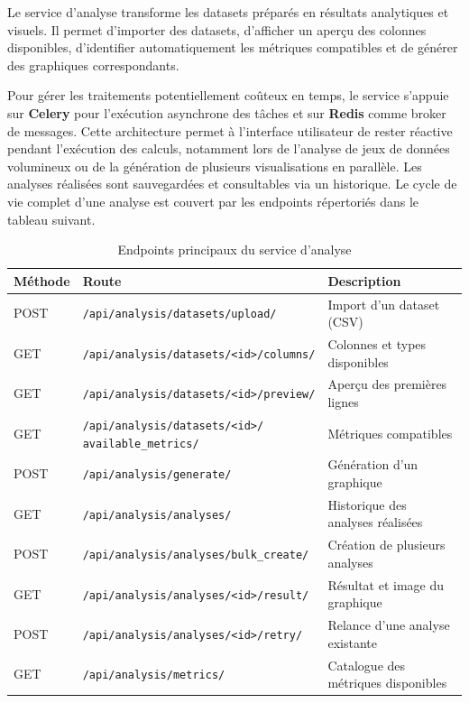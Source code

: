 Le service d'analyse transforme les datasets préparés en résultats analytiques et visuels. Il
permet d'importer des datasets, d'afficher un aperçu des colonnes disponibles, d'identifier
automatiquement les métriques compatibles et de générer des graphiques correspondants.

Pour gérer les traitements potentiellement coûteux en temps, le service s'appuie sur
\textbf{Celery} pour l'exécution asynchrone des tâches et sur \textbf{Redis} comme broker de
messages. Cette architecture permet à l'interface utilisateur de rester réactive pendant
l'exécution des calculs, notamment lors de l'analyse de jeux de données volumineux ou de la
génération de plusieurs visualisations en parallèle. Les analyses réalisées sont sauvegardées
et consultables via un historique. Le cycle de vie complet d'une analyse est couvert par les
endpoints répertoriés dans le tableau suivant.

\begin{table}[H]
\centering
\small
\caption{Endpoints principaux du service d'analyse}
\label{tab:endpoints-analyze}
\begin{tabular}{|>{\centering\arraybackslash}p{1.5cm}
                |>{\raggedright\arraybackslash}p{7.2cm}
                |>{\raggedright\arraybackslash}p{3.8cm}|}
\hline
\textbf{Méthode} & \textbf{Route} & \textbf{Description} \\
\hline
POST & \texttt{/api/analysis/datasets/upload/} & Import d'un dataset (CSV) \\
\hline
GET & \texttt{/api/analysis/datasets/<id>/columns/} & Colonnes et types disponibles \\
\hline
GET & \texttt{/api/analysis/datasets/<id>/preview/} & Aperçu des premières lignes \\
\hline
GET & \makecell[l]{\texttt{/api/analysis/datasets/<id>/} \\ \texttt{available\_metrics/}} & Métriques compatibles \\
\hline
POST & \texttt{/api/analysis/generate/} & Génération d'un graphique \\
\hline
GET & \texttt{/api/analysis/analyses/} & Historique des analyses réalisées \\
\hline
POST & \texttt{/api/analysis/analyses/bulk\_create/} & Création de plusieurs analyses \\
\hline
GET & \texttt{/api/analysis/analyses/<id>/result/} & Résultat et image du graphique \\
\hline
POST & \texttt{/api/analysis/analyses/<id>/retry/} & Relance d'une analyse existante \\
\hline
GET & \texttt{/api/analysis/metrics/} & Catalogue des métriques disponibles \\
\hline
\end{tabular}
\end{table}


